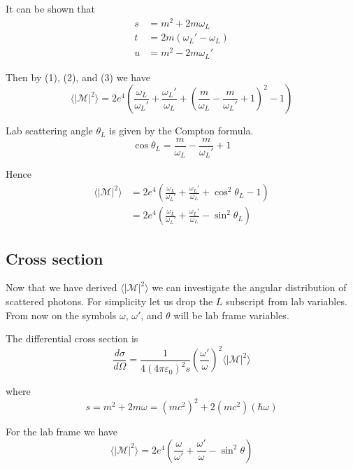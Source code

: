 \documentclass[12pt]{article}
\begin{document}
It can be shown that
\begin{equation*}
\begin{aligned}
s&=m^2+2m\omega_L
\\
t&=2m(\omega_L' - \omega_L)
\\
u&=m^2-2 m \omega_L'
\end{aligned}
\tag{3}
\end{equation*}

Then by (1), (2), and (3) we have
\begin{equation*}
\langle|\mathcal{M}|^2\rangle=
2e^4\left(
\frac{\omega_L}{\omega_L'}+\frac{\omega_L'}{\omega_L}
+\left(\frac{m}{\omega_L}-\frac{m}{\omega_L'}+1\right)^2-1
\right)
\end{equation*}

Lab scattering angle $\theta_L$ is given by the Compton formula.
\begin{equation*}
\cos\theta_L=\frac{m}{\omega_L}-\frac{m}{\omega_L'}+1
\end{equation*}

Hence
\begin{align*}
\langle|\mathcal{M}|^2\rangle
&=2e^4\left(
\frac{\omega_L}{\omega_L'}+\frac{\omega_L'}{\omega_L}+\cos^2\theta_L-1
\right)
\\
&=2e^4\left(
\frac{\omega_L}{\omega_L'}+\frac{\omega_L'}{\omega_L}-\sin^2\theta_L
\right)
\end{align*}

\subsection*{Cross section}
Now that we have derived $\langle|\mathcal{M}|^2\rangle$
we can investigate the angular distribution of scattered photons.
For simplicity let us drop the $L$ subscript from lab variables.
From now on the symbols $\omega$, $\omega'$, and $\theta$ will be lab frame variables.

\bigskip
The differential cross section is
\begin{equation*}
\frac{d\sigma}{d\Omega}=\frac{1}{4(4\pi\varepsilon_0)^2s}
\left(\frac{\omega'}{\omega}\right)^2\langle|\mathcal{M}|^2\rangle
\end{equation*}

where
\begin{equation*}
s=m^2+2m\omega=(mc^2)^2+2(mc^2)(\hbar\omega)
\end{equation*}

For the lab frame we have
\begin{equation*}
\langle|\mathcal{M}|^2\rangle
=2e^4\left(
\frac{\omega}{\omega'}+\frac{\omega'}{\omega}-\sin^2\theta
\right)
\end{equation*}
\end{document}
